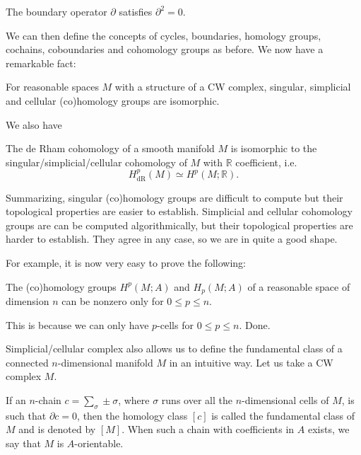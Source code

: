 \documentclass[12pt]{article}
\numberwithin{equation}{section}
\numberwithin{figure}{section}
\theoremstyle{remark}
\def\bR{\mathbb{R}}
\begin{document}
\begin{proposition}
The boundary operator $\partial$ satisfies $\partial^2=0$.
\end{proposition}

We can then define the concepts of cycles, boundaries, homology groups, cochains, coboundaries and cohomology groups as before.
We now have a remarkable fact:

\begin{theorem}
  For reasonable spaces $M$ with a structure of a CW complex,
  singular, simplicial and cellular (co)homology groups are isomorphic.
\end{theorem}

We also have

\begin{theorem}
The de Rham cohomology of a smooth manifold $M$
is isomorphic to the singular/simplicial/cellular 
cohomology of $M$ with $\bR$ coefficient, i.e. \begin{equation}
H^p_\text{dR}(M)\simeq H^p(M;\bR).
\end{equation}
\end{theorem}

Summarizing,
singular (co)homology groups are difficult to compute but their topological properties are easier to establish.
Simplicial and cellular cohomology groups are can be computed algorithmically,
 but their topological properties are harder to establish.
They agree in any case, so we are in quite a good shape.

For example, it is now very easy to prove the following:
\begin{corollary}
  The (co)homology groups $H^p(M;A)$ and $H_p(M;A)$ of a reasonable space of dimension $n$ can be nonzero
  only for $0\le p\le n$.
\end{corollary}
This is because we can only have $p$-cells for $0\le p\le n$. Done.


Simplicial/cellular complex also allows us to define the fundamental class of 
a connected $n$-dimensional manifold $M$ in an intuitive way.
Let us take a CW complex $M$.
\begin{definition}
If an $n$-chain $c=\sum_{\sigma} \pm \sigma$,
where $\sigma$ runs over all the $n$-dimensional cells of $M$, is such that $\partial c=0$,
then the homology class $[c]$ is called the fundamental class of $M$
and is denoted by $[M]$.
When such a chain with coefficients in $A$ exists, 
we say that $M$ is $A$-orientable.
\end{definition}
\end{document}
